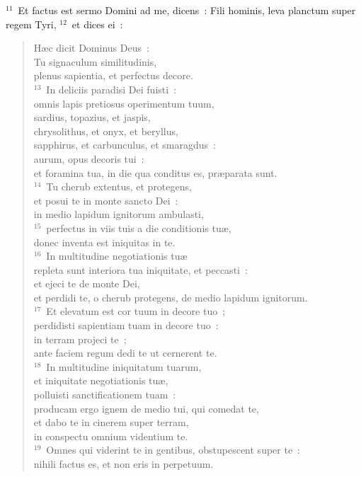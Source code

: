 ${}^{11}$~Et factus est sermo Domini ad me, dicens~: Fili hominis, leva planctum super regem Tyri,
${}^{12}$~et dices ei~: \begin{verse}H\ae c dicit Dominus Deus~:\\ Tu signaculum similitudinis,\\ plenus sapientia, et perfectus decore.\\
${}^{13}$~In deliciis paradisi Dei fuisti~:\\ omnis lapis pretiosus operimentum tuum,\\ sardius, topazius, et jaspis,\\ chrysolithus, et onyx, et beryllus,\\ sapphirus, et carbunculus, et smaragdus~:\\ aurum, opus decoris tui~:\\ et foramina tua, in die qua conditus es, pr\ae parata sunt.\\
${}^{14}$~Tu cherub extentus, et protegens,\\ et posui te in monte sancto Dei~:\\ in medio lapidum ignitorum ambulasti,\\
${}^{15}$~perfectus in viis tuis a die conditionis tu\ae ,\\ donec inventa est iniquitas in te.\\
${}^{16}$~In multitudine negotiationis tu\ae \\ repleta sunt interiora tua iniquitate, et peccasti~:\\ et ejeci te de monte Dei,\\ et perdidi te, o cherub protegens, de medio lapidum ignitorum.\\
${}^{17}$~Et elevatum est cor tuum in decore tuo~;\\ perdidisti sapientiam tuam in decore tuo~:\\ in terram projeci te~;\\ ante faciem regum dedi te ut cernerent te.\\
${}^{18}$~In multitudine iniquitatum tuarum,\\ et iniquitate negotiationis tu\ae ,\\ polluisti sanctificationem tuam~:\\ producam ergo ignem de medio tui, qui comedat te,\\ et dabo te in cinerem super terram,\\ in conspectu omnium videntium te.\\
${}^{19}$~Omnes qui viderint te in gentibus, obstupescent super te~:\\ nihili factus es, et non eris in perpetuum.\end{verse}


